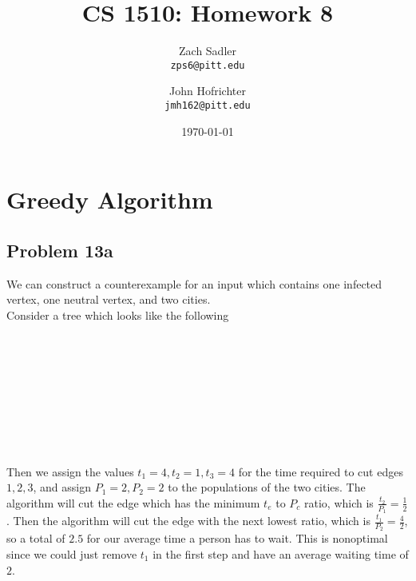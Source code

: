 \documentclass[12pt]{article}
\title{CS 1510: Homework 8}
\author{Zach Sadler \\\texttt{zps6@pitt.edu}
  \and
  John Hofrichter\\\texttt{jmh162@pitt.edu}}
\date{\today}
\begin{document}
\maketitle
\section*{Greedy Algorithm}
	\subsection*{Problem 13a}
We can construct a counterexample for an input which contains one infected vertex, one neutral vertex, and two cities.\\
Consider a tree which looks like the following\\
\\
\\				
\\
\\
\\
\\
\\
\\
\\
Then we assign the values $t_1 = 4, t_2 = 1, t_3 = 4$ for the time required to cut edges $1, 2, 3$, and assign $P_1 = 2, P_2 = 2$ to the populations of the two cities. The algorithm will cut the edge which has the minimum $t_e$ to $P_c$ ratio, which is $\frac{t_2}{P_1} = \frac{1}{2}$. Then the algorithm will cut the edge with the next lowest ratio, which is $\frac{t_1}{P_2} = \frac{4}{2}$, so a total of $2.5$ for our average time a person has to wait. This is nonoptimal since we could just remove $t_1$ in the first step and have an average waiting time of $2$.
		
\end{document}
